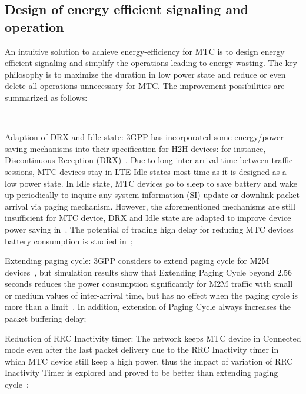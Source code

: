 \subsection{Design of energy efficient signaling and operation}
An intuitive solution to achieve energy-efficiency for MTC is to design energy efficient signaling and simplify the operations leading to energy wasting. The key philosophy is to maximize the duration in low power state and reduce or even delete all operations unnecessary for MTC. The improvement possibilities are summarized as follows:\begin{inparaenum}[(1)]
	\\
	\item Adaption of DRX and Idle state: 3GPP has incorporated some energy/power saving mechanisms into their specification for H2H devices: for instance, Discontinuous Reception (DRX)~\cite{3GPP/ue-procedure-idle}. Due to long inter-arrival time between traffic sessions, MTC devices stay in LTE Idle states most time as it is designed as a low power state. In Idle state, MTC devices go to sleep to save battery and wake up periodically to inquire any system information (SI) update or downlink packet arrival via paging mechanism. However, the aforementioned mechanisms are still insufficient for MTC device, DRX and Idle state are adapted to improve device power saving in~\cite{Gupta2013}. The potential of trading high delay for reducing MTC devices battery consumption is studied in~\cite{tirronen2012reducing};\\ 
	\item Extending paging cycle: 3GPP considers to extend paging cycle for M2M devices~\cite{3GPP/service-requirement}\cite{3GPP/ranimprovements}\cite{3GPP/TR/23887V12}, but simulation results show that Extending Paging Cycle beyond $2.56$ seconds reduces the power consumption significantly for M2M traffic with small or medium values of inter-arrival time, but has no effect when the paging cycle is more than a limit~\cite{SCJha2013}. In addition, extension of Paging Cycle always increases the packet buffering delay;\\
	\item Reduction of RRC Inactivity timer: The network keeps MTC device in Connected mode even after the last packet delivery due to the RRC Inactivity timer in which MTC device still keep a high power, thus the impact of variation of RRC Inactivity Timer is explored and proved to be better than extending paging cycle~\cite{SCJha2013};\\

\end{inparaenum}
